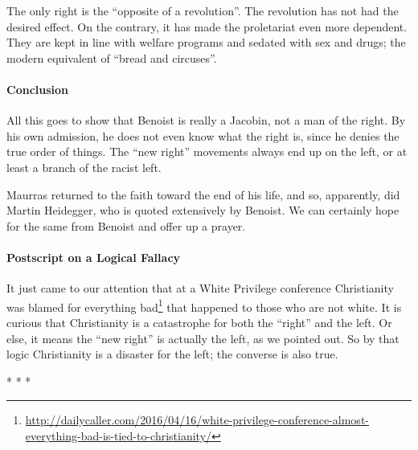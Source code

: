 The only right is the ``opposite of a revolution''. The revolution has not had the desired effect. On the contrary, it has made the proletariat even more dependent. They are kept in line with welfare programs and sedated with sex and drugs; the modern equivalent of ``bread and circuses''.

\paragraph{Conclusion}


All this goes to show that Benoist is really a Jacobin, not a man of the right. By his own admission, he does not even know what the right is, since he denies the true order of things. The ``new right'' movements always end up on the left, or at least a branch of the racist left.

Maurras returned to the faith toward the end of his life, and so, apparently, did Martin Heidegger, who is quoted extensively by Benoist. We can certainly hope for the same from Benoist and offer up a prayer.

\paragraph{Postscript on a Logical Fallacy}


It just came to our attention that at a White Privilege conference Christianity was blamed for everything bad\footnote{\url{http://dailycaller.com/2016/04/16/white-privilege-conference-almost-everything-bad-is-tied-to-christianity/}} that happened to those who are not white. It is curious that Christianity is a catastrophe for both the ``right'' and the left. Or else, it means the ``new right'' is actually the left, as we pointed out. So by that logic Christianity is a disaster for the left; the converse is also true.



\begin{center}* * *\end{center}

